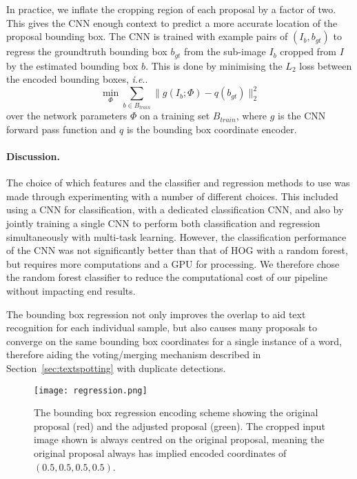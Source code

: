 \documentclass[twocolumn]{svjour3}          \smartqed  \usepackage{epsfig}
\makeatletter
\DeclareRobustCommand\onedot{\futurelet\@let@token\@onedot}
\def\@onedot{\ifx\@let@token.\else.\null\fi\xspace}
\def\ie{\emph{i.e}\onedot} \def\Ie{\emph{I.e}\onedot}
\makeatother
\begin{document}
In practice, we inflate the cropping region of each proposal by a factor of two. This gives the CNN enough context to predict a more accurate location of the proposal bounding box. The CNN is trained with example pairs of $(I_b,b_{gt})$ to regress the groundtruth bounding box $b_{gt}$ from the sub-image $I_b$ cropped from $I$ by the estimated bounding box $b$. This is done by minimising the $L_2$ loss between the encoded bounding boxes, \ie 
\begin{equation}
\min_{\Phi} \sum_{b\in B_{train}} \|g(I_b;\Phi) - q(b_{gt})\|^2_2
\label{eqn:regcost}
\end{equation}
over the network parameters $\Phi$ on a training set $B_{train}$, where $g$ is the CNN forward pass function and $q$ is the bounding box coordinate encoder.

\paragraph{Discussion.}
The choice of which features and the classifier and regression methods to use was made through experimenting with a number of different choices. This included using a CNN for classification, with a dedicated classification CNN, and also by jointly training a single CNN to perform both classification and regression simultaneously with multi-task learning. However, the classification performance of the CNN was not significantly better than that of HOG with a random forest, but requires more computations and a GPU for processing. We therefore chose the random forest classifier to reduce the computational cost of our pipeline without impacting end results.

The bounding box regression not only improves the overlap to aid text recognition for each individual sample, but also causes many proposals to converge on the same bounding box coordinates for a single instance of a word, therefore aiding the voting/merging mechanism described in Section~\ref{sec:textspotting} with duplicate detections. 

\begin{figure}
\begin{center}
\texttt{[image: regression.png]} 
\caption{The bounding box regression encoding scheme showing the original proposal (red) and the adjusted proposal (green). The cropped input image shown is always centred on the original proposal, meaning the original proposal always has implied encoded coordinates of $(0.5,0.5,0.5,0.5)$.}
\label{fig:encoding}
\end{center}
\end{figure}
\end{document}
